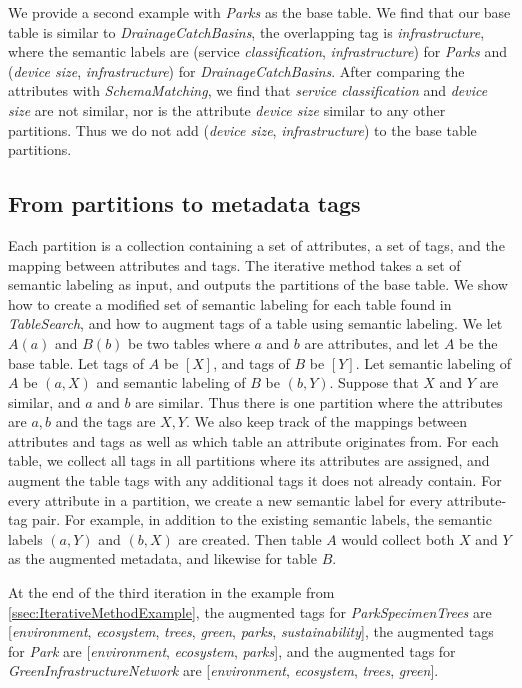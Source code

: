 We provide a second example with \textit{Parks} as the base table. We find that our base table is similar to \textit{DrainageCatchBasins}, the overlapping tag is \textit{infrastructure}, where the semantic labels are (service \textit{classification}, \textit{infrastructure}) for \textit{Parks} and (\textit{device size}, \textit{infrastructure}) for \textit{DrainageCatchBasins}. After comparing the attributes with \textit{SchemaMatching}, we find that \textit{service classification} and \textit{device size} are not similar, nor is the attribute \textit{device size} similar to any other partitions. Thus we do not add (\textit{device size}, \textit{infrastructure}) to the base table partitions.

\subsection{From partitions to metadata tags}
\label{ssec:FromPartitionsToMetadataTags}

Each partition is a collection containing a set of attributes, a set of tags, and the mapping between attributes and tags. The iterative method takes a set of semantic labeling as input, and outputs the partitions of the base table. We show how to create a modified set of semantic labeling for each table found in \textit{TableSearch}, and how to augment tags of a table using semantic labeling. We let $A(a)$ and $B(b)$ be two tables where $a$ and $b$ are attributes, and let $A$ be the base table. Let tags of $A$ be $[X]$, and tags of $B$ be $[Y]$. Let semantic labeling of $A$ be ${(a, X)}$ and semantic labeling of $B$ be ${(b, Y)}$. Suppose that $X$ and $Y$ are similar, and $a$ and $b$ are similar. Thus there is one partition where the attributes are ${a, b}$ and the tags are ${X, Y}$. We also keep track of the mappings between attributes and tags as well as which table an attribute originates from. For each table, we collect all tags in all partitions where its attributes are assigned, and augment the table tags with any additional tags it does not already contain. For every attribute in a partition, we create a new semantic label for every attribute-tag pair. For example, in addition to the existing semantic labels, the semantic labels $(a, Y)$ and $(b, X)$ are created. Then table $A$ would collect both $X$ and $Y$ as the augmented metadata, and likewise for table $B$.

At the end of the third iteration in the example from \autoref{ssec:IterativeMethodExample}, the augmented tags for \textit{ParkSpecimenTrees} are [\textit{environment}, \textit{ecosystem}, \textit{trees}, \textit{green}, \textit{parks}, \textit{sustainability}], the augmented tags for \textit{Park} are [\textit{environment}, \textit{ecosystem}, \textit{parks}], and the augmented tags for \textit{GreenInfrastructureNetwork} are [\textit{environment}, \textit{ecosystem}, \textit{trees}, \textit{green}].


